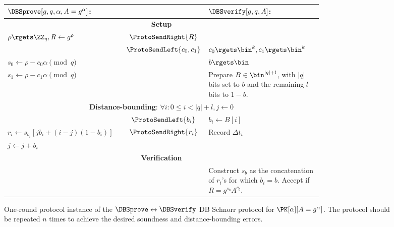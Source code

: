 \begin{figure*}
  \centering
  \small
  \setlength{\ProtoArrowLength}{0.07\linewidth}
  \begin{tabular}{p{0.40\linewidth}cp{0.40\linewidth}}
    \(\DBSprove[g, q, \alpha, A = g^\alpha]\):
    & &
    \(\DBSverify[g, q, A]\):
    \\
    \midrule

    \multicolumn{3}{c}{\textbf{Setup}} \\

    \(\rho\rgets \ZZ_q, R\gets g^{\rho}\)
    & \(\ProtoSendRight{R}\)
    &
    \\

    & \(\ProtoSendLeft{c_0, c_1}\)
    & \(c_0\rgets \bin^k, c_1\rgets \bin^k\)
    \\

    \(s_0\gets \rho - c_0\alpha \pmod q\)
    &
    & \(b\rgets \bin\)
    \\

    \(s_1\gets \rho - c_1\alpha \pmod q\)
    &
    & Prepare \(B\in \bin^{|q|+l}\), with \(|q|\) bits set to \(b\) and the 
    remaining \(l\) bits to \(1-b\).
    \\

    \midrule
    \multicolumn{3}{c}{\textbf{Distance-bounding}: \(\forall i: 0\leq i < |q| + 
        l, j\gets 0\)} \\


    & \(\ProtoSendLeft{b_i}\)
    & \(b_i\gets B[i]\)
    \\

    \(r_i\gets s_{b_i}[jb_i + (i-j)(1-b_i)]\)
    & \(\ProtoSendRight{r_i}\)
    & Record \(\Delta t_i\)
    \\

    \(j \gets j + b_i\)
    &
    &
    \\

    \midrule
    \multicolumn{3}{c}{\textbf{Verification}}
    \\

    &
    & Construct \(s_b\) as the concatenation of \(r_i\)'s for which \(b_i = 
      b\).
      Accept if \(R = g^{s_b} A^{c_b}\).
    \\
    
  \end{tabular}
  \caption{%
    One-round protocol instance of the \(\DBSprove\leftrightarrow \DBSverify\) \ac{DB} Schnorr protocol for \(\PK[\alpha][A = g^\alpha]\).
    The protocol should be repeated \(n\) times to achieve the desired 
    soundness and distance-bounding errors.
  }%
  \label{DB-Schnorr-nbit-figure}
\end{figure*}

